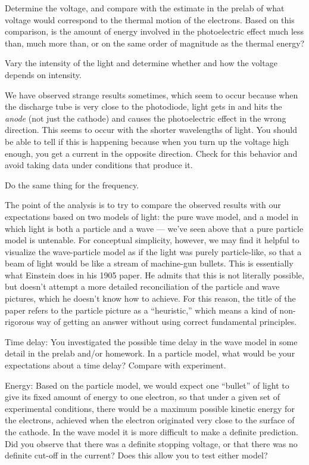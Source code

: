 Determine the voltage, and compare with the estimate in the prelab of what voltage would
correspond to the thermal motion of the electrons. Based on this comparison, is the amount of
energy involved in the photoelectric effect much less than, much more than, or on the same
order of magnitude as the thermal energy?


Vary the intensity of the light and determine whether and how the voltage depends on intensity.

We have observed strange results sometimes, which seem to occur because when the discharge tube is
very close to the photodiode, light gets in and hits the \emph{anode} (not just the cathode) and
causes the photoelectric effect in the wrong direction. This seems to occur with the shorter wavelengths
of light. You should be able to tell if this is happening because when you turn up the voltage high
enough, you get a current in the opposite direction. Check for this behavior and avoid taking data
under conditions that produce it.


Do the same thing for the frequency.

\analysis

The point of the analysis is to try to compare the observed results with our expectations based
on two models of light:
the pure wave model, and a model in which light is both a particle and a wave --- we've seen
above that a pure particle model is untenable. For conceptual simplicity, however, we may find
it helpful to visualize the wave-particle model as if the light was purely particle-like, so
that a beam of light would be like a stream of machine-gun bullets. This is essentially what
Einstein does in his 1905 paper. He admits that this is not literally possible, but doesn't attempt
a more detailed reconciliation of the particle and wave pictures, which he doesn't know how to
achieve. For this reason, the title of the paper refers to the particle picture as a ``heuristic,''
which means a kind of non-rigorous way of getting an answer without using correct fundamental principles.

Time delay: You investigated the possible time delay in the wave model in some detail in the
prelab and/or homework. In a particle model, what would be your expectations about a time
delay? Compare with experiment.

Energy: Based on the particle model, we would expect one ``bullet'' of light to give its fixed
amount of energy to one electron, so that under a given set of experimental conditions, there
would be a maximum possible kinetic energy for the electrons, achieved when the electron originated
very close to the surface of the cathode. In the wave model it is more difficult to make a definite
prediction. Did you observe that there was a definite stopping voltage, or that there was no definite
cut-off in the current? Does this allow you to test either model?

